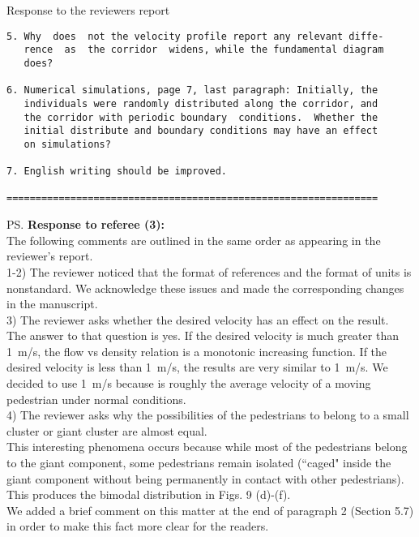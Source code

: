 \documentclass[a4paper,12pt]{letter}
\begin{document}
\begin{letter}{Response to the reviewers report}
\begin{verbatim}
5. Why  does  not the velocity profile report any relevant diffe-
   rence  as  the corridor  widens, while the fundamental diagram
   does?

6. Numerical simulations, page 7, last paragraph: Initially, the 
   individuals were randomly distributed along the corridor, and 
   the corridor with periodic boundary  conditions.  Whether the 
   initial distribute and boundary conditions may have an effect 
   on simulations?

7. English writing should be improved.

================================================================

\end{verbatim}


\ps{\textbf{Response to referee (3):} \\

The following comments are outlined in the same order as appearing in the
reviewer’s report. \\

1-2) The reviewer noticed that the format of references and the format of units is nonstandard. We acknowledge these issues and made the corresponding changes in the manuscript.\\

3) The reviewer asks whether the desired velocity has an effect on the result.\\

The answer to that question is yes. If the desired velocity is much greater than 1~m/s, the flow vs density relation is a monotonic increasing function. If the desired velocity is less than 1~m/s, the results are very similar to 1~m/s. We decided to use 1~m/s because is roughly the average velocity of a moving pedestrian under normal conditions. \\

4) The reviewer asks why the possibilities of the pedestrians to belong to a small cluster or giant cluster are almost equal. \\

This interesting phenomena occurs because while most of the pedestrians belong to the giant component, some pedestrians remain isolated (``caged" inside the giant component without being permanently in contact with other pedestrians). This produces the bimodal distribution in Figs. 9 (d)-(f).\\

We added a brief comment on this matter at the end of paragraph 2 (Section 5.7) in order to make this fact more clear for the readers.  \\ 

}
\end{letter}
\end{document}
